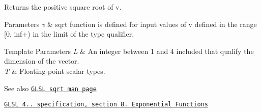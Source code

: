 Returns the positive square root of v.


\begin{DoxyParams}{Parameters}
{\em v} & sqrt function is defined for input values of v defined in the range \mbox{[}0, inf+) in the limit of the type qualifier. \\
\hline
\end{DoxyParams}

\begin{DoxyTemplParams}{Template Parameters}
{\em L} & An integer between 1 and 4 included that qualify the dimension of the vector. \\
\hline
{\em T} & Floating-\/point scalar types.\\
\hline
\end{DoxyTemplParams}
\begin{DoxySeeAlso}{See also}
\href{http://www.opengl.org/sdk/docs/manglsl/xhtml/sqrt.xml}{\tt G\+L\+SL sqrt man page} 

\href{http://www.opengl.org/registry/doc/GLSLangSpec.4.20.8.pdf}{\tt G\+L\+SL 4.. specification, section 8. Exponential Functions} 
\end{DoxySeeAlso}
